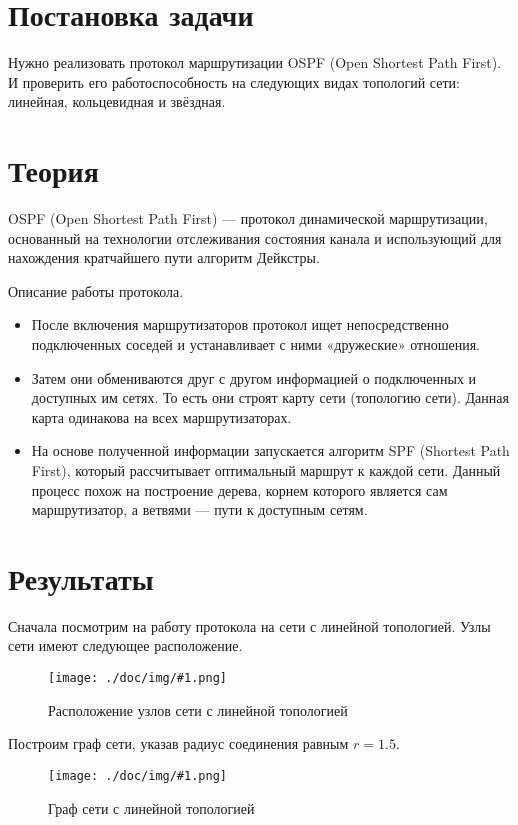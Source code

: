 \documentclass[a4paper,12pt]{article}
\newcommand{\plot}[3]{
    \label{#3}
    \begin{figure}[H]
        \begin{center}
            \texttt{[image: ./doc/img/\#1.png]}
            \caption{#2}
        \end{center}
    \end{figure}
}
\begin{document}
    
    \newpage

    \tableofcontents
    \listoffigures
    \newpage

    \section{Постановка задачи}
    \quad Нужно реализовать протокол маршрутизации OSPF (Open Shortest Path First).
    И проверить его работоспособность на следующих видах топологий сети:
    линейная, кольцевидная и звёздная.

    \section{Теория}
    OSPF (Open Shortest Path First) — протокол динамической маршрутизации,
    основанный на технологии отслеживания состояния канала
    и использующий для нахождения кратчайшего пути алгоритм Дейкстры.

    Описание работы протокола.
    \begin{itemize}
        \item После включения маршрутизаторов протокол ищет непосредственно подключенных соседей
        и устанавливает с ними «дружеские» отношения.
        \item Затем они обмениваются друг с другом информацией о подключенных и доступных им сетях.
        То есть они строят карту сети (топологию сети).
        Данная карта одинакова на всех маршрутизаторах.
        \item На основе полученной информации запускается алгоритм SPF (Shortest Path First),
        который рассчитывает оптимальный маршрут к каждой сети.
        Данный процесс похож на построение дерева, корнем которого является сам маршрутизатор,
        а ветвями — пути к доступным сетям.
    \end{itemize}

    \section{Результаты}
    Сначала посмотрим на работу протокола на сети с линейной топологией.
    Узлы сети имеют следующее расположение.
    \plot{full_line_points}{Расположение узлов сети с линейной топологией}{p:fullLinePoints}

    Построим граф сети, указав радиус соединения равным $ r = 1.5 $.
    \plot{full_line}{Граф сети с линейной топологией}{p:fullLine}
\end{document}

